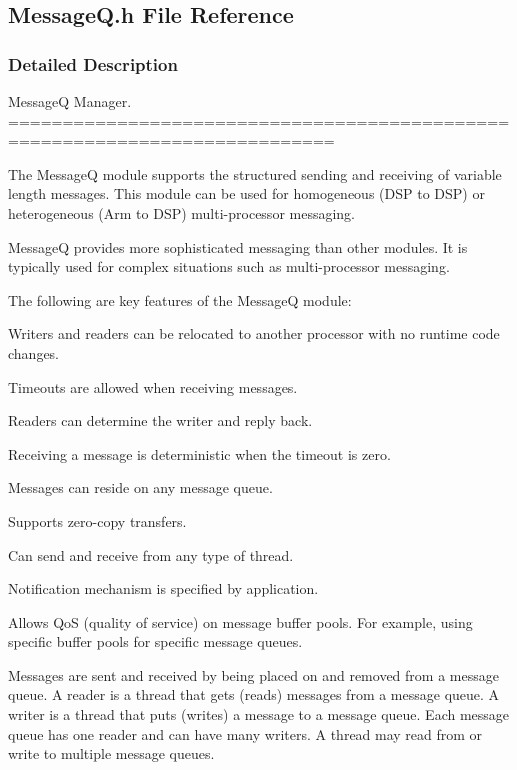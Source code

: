 \subsection{MessageQ.h File Reference}
\label{_message_q_8h}


\subsubsection{Detailed Description}
MessageQ Manager. ============================================================================

The MessageQ module supports the structured sending and receiving of variable length messages. This module can be used for homogeneous (DSP to DSP) or heterogeneous (Arm to DSP) multi-\/processor messaging.

MessageQ provides more sophisticated messaging than other modules. It is typically used for complex situations such as multi-\/processor messaging.

The following are key features of the MessageQ module:
\begin{DoxyItemize}
\item Writers and readers can be relocated to another processor with no runtime code changes.
\item Timeouts are allowed when receiving messages.
\item Readers can determine the writer and reply back.
\item Receiving a message is deterministic when the timeout is zero.
\item Messages can reside on any message queue.
\item Supports zero-\/copy transfers.
\item Can send and receive from any type of thread.
\item Notification mechanism is specified by application.
\item Allows QoS (quality of service) on message buffer pools. For example, using specific buffer pools for specific message queues.
\end{DoxyItemize}

Messages are sent and received by being placed on and removed from a message queue. A reader is a thread that gets (reads) messages from a message queue. A writer is a thread that puts (writes) a message to a message queue. Each message queue has one reader and can have many writers. A thread may read from or write to multiple message queues.

